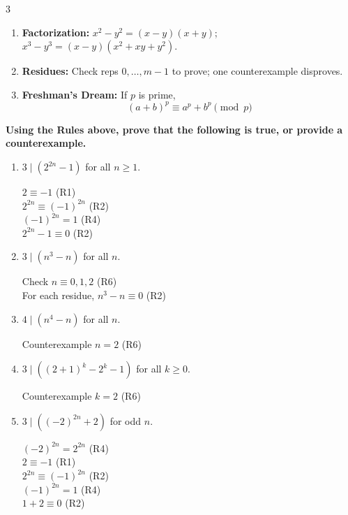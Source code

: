 \documentclass[9pt]{article}
\begin{document}
\begin{multicols}{3}
\begin{enumerate}
\item[\textbf{R5}] \textbf{Factorization:} 
\(x^2 - y^2 = (x - y)(x + y)\); 
\(x^3 - y^3 = (x - y)(x^2 + xy + y^2)\).

\item[\textbf{R6}] \textbf{Residues:} 
Check reps \(0,\dots,m-1\) to prove;
one counterexample disproves.

\item[\textbf{R7}] \textbf{Freshman’s Dream:}  
If \(p\) is prime,
\[
(a+b)^p \equiv a^p + b^p \pmod p
\]

\end{enumerate}

\textbf{Using the Rules above, prove that the following is true, or provide a counterexample.}


\begin{enumerate}

\item $3\mid(2^{2n}-1)$ for all $n\ge1$.
\begin{solutionbox}
$2 \equiv -1$ \hfill (R1)\\
$2^{2n} \equiv (-1)^{2n}$ \hfill (R2)\\
$(-1)^{2n} = 1$ \hfill (R4)\\
$2^{2n}-1 \equiv 0$ \hfill (R2)
\end{solutionbox}

\item $3\mid(n^3 - n)$ for all $n$.
\begin{solutionbox}
Check $n \equiv 0,1,2$ \hfill (R6)\\
For each residue, $n^3 - n \equiv 0$ \hfill (R2)
\end{solutionbox}

\item $4\mid(n^4 - n)$ for all $n$.
\begin{solutionbox}
Counterexample $n=2$ \hfill (R6)
\end{solutionbox}

\item $3\mid((2+1)^k - 2^k - 1)$ for all $k\ge0$.
\begin{solutionbox}
Counterexample $k=2$ \hfill (R6)
\end{solutionbox}

\item $3\mid((-2)^{2n}+2)$ for odd $n$.
\begin{solutionbox}
$(-2)^{2n} = 2^{2n}$ \hfill (R4)\\
$2 \equiv -1$ \hfill (R1)\\
$2^{2n} \equiv (-1)^{2n}$ \hfill (R2)\\
$(-1)^{2n} = 1$ \hfill (R4)\\
$1+2 \equiv 0$ \hfill (R2)
\end{solutionbox}


\end{enumerate}
\end{multicols}
\end{document}
